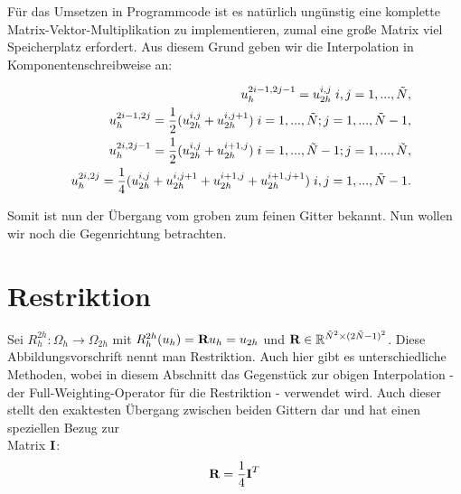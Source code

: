 \label{img.Prolongation}

Für das Umsetzen in Programmcode ist es natürlich ungünstig eine komplette Matrix-Vektor-Multiplikation zu implementieren, zumal eine große Matrix viel Speicherplatz erfordert. Aus diesem Grund geben wir die Interpolation in Komponentenschreibweise an:

\begin{eqnarray}
&&u_{h}^{2i-1,2j-1} = u_{2h}^{i,j} \hspace{0.1cm} i,j = 1,...,\tilde N, \\
&&u_{h}^{2i-1,2j} = \frac{1}{2} (u_{2h}^{i,j} + u_{2h}^{i,j+1}) \hspace{0.1cm} i = 1,...,\tilde N; j = 1,...,\tilde N - 1, \\
&&u_{h}^{2i,2j-1} = \frac{1}{2} (u_{2h}^{i,j} + u_{2h}^{i+1,j}) \hspace{0.1cm} i = 1,...,\tilde N - 1; j = 1,...,\tilde N, \\
&&u_{h}^{2i,2j} = \frac{1}{4} (u_{2h}^{i,j} + u_{2h}^{i,j+1} + u_{2h}^{i+1,j} + u_{2h}^{i+1,j+1}) \hspace{0.1cm} i,j = 1,...,\tilde N - 1.
\end{eqnarray}

Somit ist nun der Übergang vom groben zum feinen Gitter bekannt. Nun wollen wir noch die Gegenrichtung betrachten.

\section{Restriktion}

Sei $R_{h}^{2h}: \Omega_{h} \longrightarrow \Omega_{2h}$ mit $R_{h}^{2h}(u_{h}) = {\textbf{R}}u_{h} = u_{2h}$ und ${\textbf{R}} \in \mathbb{R}^{\tilde N^{2} \times (2 \tilde N - 1)^{2}}$. Diese Abbildungsvorschrift nennt man Restriktion. Auch hier gibt es unterschiedliche Methoden, wobei in diesem Abschnitt das Gegenstück zur obigen Interpolation - der Full-Weighting-Operator für die Restriktion - verwendet wird. Auch dieser stellt den exaktesten Übergang zwischen beiden Gittern dar und hat einen speziellen Bezug zur \\Matrix ${\textbf{I}}$:
\begin{equation}
{\textbf{R}} = \frac {1} {4} {\textbf{I}}^{T}
\end{equation}

